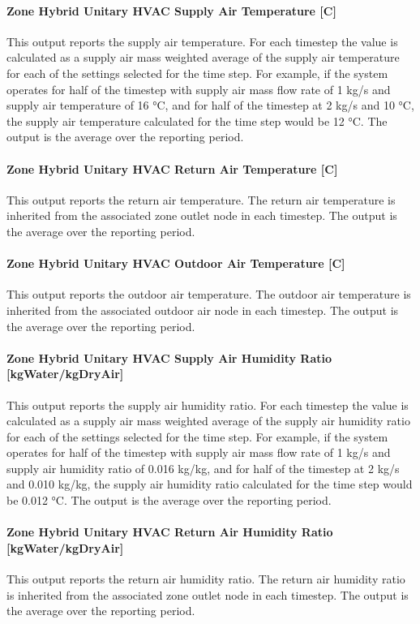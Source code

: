 \paragraph{Zone Hybrid Unitary HVAC Supply Air Temperature [C]}
This output reports the supply air temperature. For each timestep the value is calculated as a supply air mass weighted average of the supply air temperature for each of the settings selected for the time step. For example, if the system operates for half of the timestep with supply air mass flow rate of 1 kg/s and supply air temperature of 16 °C, and for half of the timestep at 2 kg/s and 10 °C, the supply air temperature calculated for the time step would be 12 °C. The output is the average over the reporting period.

\paragraph{Zone Hybrid Unitary HVAC Return Air Temperature [C]}
This output reports the return air temperature. The return air temperature is inherited from the associated zone outlet node in each timestep. The output is the average over the reporting period.

\paragraph{Zone Hybrid Unitary HVAC Outdoor Air Temperature [C]}
This output reports the outdoor air temperature.  The outdoor air temperature is inherited from the associated outdoor air node in each timestep.  The output is the average over the reporting period.

\paragraph{Zone Hybrid Unitary HVAC Supply Air Humidity Ratio [kgWater/kgDryAir]}
This output reports the supply air humidity ratio. For each timestep the value is calculated as a supply air mass weighted average of the supply air humidity ratio for each of the settings selected for the time step. For example, if the system operates for half of the timestep with supply air mass flow rate of 1 kg/s and supply air humidity ratio of 0.016 kg/kg, and for half of the timestep at 2 kg/s and 0.010 kg/kg, the supply air humidity ratio calculated for the time step would be 0.012 °C. The output is the average over the reporting period.

\paragraph{Zone Hybrid Unitary HVAC Return Air Humidity Ratio [kgWater/kgDryAir]}
This output reports the return air humidity ratio. The return air humidity ratio is inherited from the associated zone outlet node in each timestep.  The output is the average over the reporting period.

